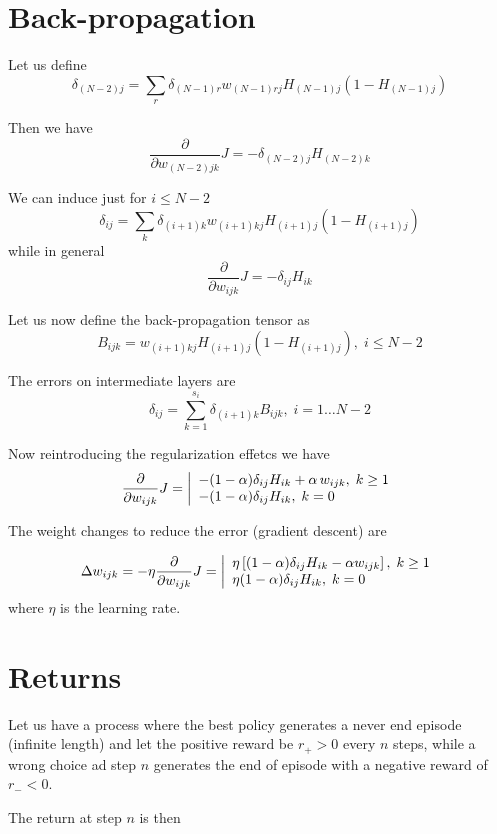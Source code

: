 \documentclass[a4paper,11pt]{article}
\begin{document}
\section{Back-propagation}

Let us define
\[
	\delta_{(N-2)j} =
	\sum_r \delta_{(N-1)r} w_{(N-1)rj} H_{(N-1)j} (1 - H_{(N-1)j})
\]

Then we have
\[
	\frac{\partial}{\partial w_{(N-2)jk}} J =
	- \delta_{(N-2)j}  H_{(N-2)k}
\]

We can induce just for $ i \le N - 2 $ 
\[
	\delta_{ij} =
	\sum_k \delta_{(i+1)k} w_{(i+1)kj} H_{(i+1)j} (1 - H_{(i+1)j})
\]
while in general
\[
	\frac{\partial}{\partial w_{ijk}} J =
	- \delta_{ij} H_{ik}
\]

Let us now define the back-propagation tensor as
\[
  B_{ijk} =  w_{(i+1)kj} H_{(i+1)j} (1 - H_{(i+1)j}), \; i \le N-2
\]

The errors on intermediate layers are
\[
  \delta_{ij} = \sum_{k=1}^{s_i} \delta_{(i+1)k} B_{ijk},\; i = 1 \dots N-2
\]

Now reintroducing the regularization effetcs we have
\[
	\frac{\partial}{\partial w_{ijk}} J =\left|
    \begin{array}l
		-(1 - \alpha) \delta_{ij} H_{ik} + \alpha \, w_{ijk}, \; k \ge 1
	      \\
		-(1 - \alpha) \delta_{ij} H_{ik}, \; k =0
    \end{array}
  \right.
\]

The weight changes to reduce the error (gradient descent) are

\[
  \Delta w_{ijk}  = -\eta \frac{\partial}{\partial w_{ijk}} J = \left|
  \begin{array}l
    \eta \left[ (1 - \alpha) \delta_{ij} H_{ik} - \alpha w_{ijk} \right], \; k \ge 1
    \\
    \eta (1 - \alpha) \delta_{ij} H_{ik}, \; k = 0
  \end{array}
  \right.
\]
where $ \eta $ is the learning rate.


\section{Returns}

Let us have a process where the best policy generates a never end episode (infinite length) and let the positive reward be $ r_+ > 0 $ every $ n $ steps, while a wrong choice ad step $ n $ generates the end of episode with a negative reward of $ r_- < 0 $.

The return at step $ n $ is then
\end{document}
